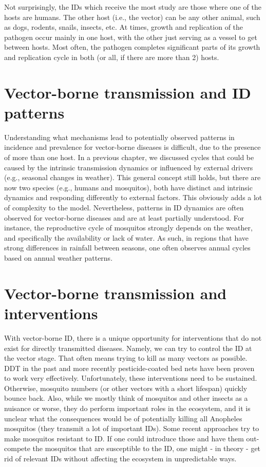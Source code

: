 \documentclass[]{book}
\theoremstyle{definition}
\theoremstyle{definition}
\theoremstyle{definition}
\theoremstyle{remark}
\begin{document}
Not surprisingly, the IDs which receive the most study are those where
one of the hosts are humans. The other host (i.e., the vector) can be
any other animal, such as dogs, rodents, snails, insects, etc. At times,
growth and replication of the pathogen occur mainly in one host, with
the other just serving as a vessel to get between hosts. Most often, the
pathogen completes significant parts of its growth and replication cycle
in both (or all, if there are more than 2) hosts.

\hypertarget{vector-borne-transmission-and-id-patterns}{%
\section{Vector-borne transmission and ID
patterns}\label{vector-borne-transmission-and-id-patterns}}

Understanding what mechanisms lead to potentially observed patterns in
incidence and prevalence for vector-borne diseases is difficult, due to
the presence of more than one host. In a previous chapter, we discussed
cycles that could be caused by the intrinsic transmission dynamics or
influenced by external drivers (e.g., seasonal changes in weather). This
general concept still holds, but there are now two species (e.g., humans
and mosquitos), both have distinct and intrinsic dynamics and responding
differently to external factors. This obviously adds a lot of complexity
to the model. Nevertheless, patterns in ID dynamics are often observed
for vector-borne diseases and are at least partially understood. For
instance, the reproductive cycle of mosquitos strongly depends on the
weather, and specifically the availability or lack of water. As such, in
regions that have strong differences in rainfall between seasons, one
often observes annual cycles based on annual weather patterns.

\hypertarget{vector-borne-transmission-and-interventions}{%
\section{Vector-borne transmission and
interventions}\label{vector-borne-transmission-and-interventions}}

With vector-borne ID, there is a unique opportunity for interventions
that do not exist for directly transmitted diseases. Namely, we can try
to control the ID at the vector stage. That often means trying to kill
as many vectors as possible. DDT in the past and more recently
pesticide-coated bed nets have been proven to work very effectively.
Unfortunately, these interventions need to be sustained. Otherwise,
mosquito numbers (or other vectors with a short lifespan) quickly bounce
back. Also, while we mostly think of mosquitos and other insects as a
nuisance or worse, they do perform important roles in the ecosystem, and
it is unclear what the consequences would be of potentially killing all
Anopheles mosquitos (they transmit a lot of important IDs). Some recent
approaches try to make mosquitos resistant to ID. If one could introduce
those and have them out-compete the mosquitos that are susceptible to
the ID, one might - in theory - get rid of relevant IDs without
affecting the ecosystem in unpredictable ways.
\end{document}
